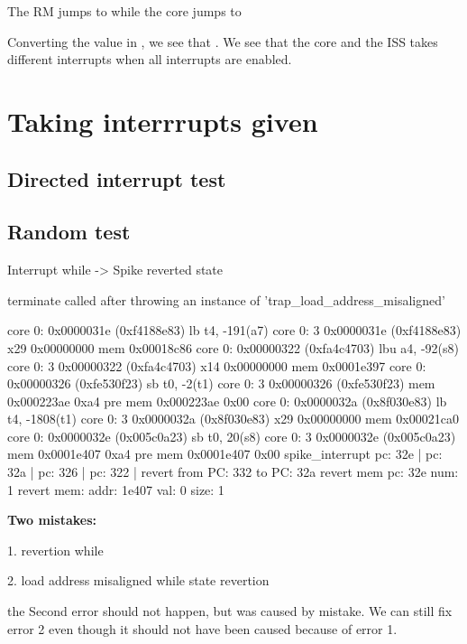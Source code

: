 \begin{terminal}
\end{terminal}

The RM jumps to  while the core jumps to 

Converting the value in , we see that  . 
We see that the core and the ISS takes different interrupts when all interrupts are enabled.


\section{Taking interrrupts given }

\subsection{Directed interrupt test}


\subsection{Random test}


Interrupt while 
-> Spike reverted state

\begin{terminal}
terminate called after throwing an instance of 'trap_load_address_misaligned'
\end{terminal}


\begin{terminal}
core   0: 0x0000031e (0xf4188e83) lb      t4, -191(a7)
core   0: 3 0x0000031e (0xf4188e83) x29 0x00000000 mem 0x00018c86
core   0: 0x00000322 (0xfa4c4703) lbu     a4, -92(s8)
core   0: 3 0x00000322 (0xfa4c4703) x14 0x00000000 mem 0x0001e397
core   0: 0x00000326 (0xfe530f23) sb      t0, -2(t1)
core   0: 3 0x00000326 (0xfe530f23) mem 0x000223ae 0xa4 pre mem 0x000223ae 0x00
core   0: 0x0000032a (0x8f030e83) lb      t4, -1808(t1)
core   0: 3 0x0000032a (0x8f030e83) x29 0x00000000 mem 0x00021ca0
core   0: 0x0000032e (0x005c0a23) sb      t0, 20(s8)
core   0: 3 0x0000032e (0x005c0a23) mem 0x0001e407 0xa4 pre mem 0x0001e407 0x00
spike_interrupt
pc: 32e | pc: 32a | pc: 326 | pc: 322 | 
revert from PC: 332 to PC: 32a
revert mem pc: 32e num: 1
revert mem: addr: 1e407 val: 0 size: 1
\end{terminal}

\textbf{Two mistakes:}

1. revertion while  

2. load address misaligned while state revertion


the Second error should not happen, but was caused by mistake. We can still fix error 2 even though it should not have been caused because of error 1.


